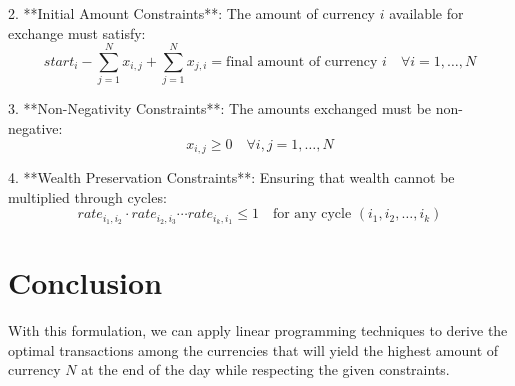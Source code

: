 \documentclass{article}
\begin{document}
2. **Initial Amount Constraints**: The amount of currency \(i\) available for exchange must satisfy:
   \[
   start_i - \sum_{j=1}^{N} x_{i,j} + \sum_{j=1}^{N} x_{j,i} = \text{final amount of currency } i \quad \forall i = 1, \ldots, N
   \]

3. **Non-Negativity Constraints**: The amounts exchanged must be non-negative:
   \[
   x_{i,j} \geq 0 \quad \forall i,j = 1, \ldots, N
   \]

4. **Wealth Preservation Constraints**: Ensuring that wealth cannot be multiplied through cycles:
   \[
   rate_{i_1,i_2} \cdot rate_{i_2,i_3} \cdots rate_{i_k,i_1} \leq 1 \quad \text{for any cycle } (i_1, i_2, \ldots, i_k)
   \]

\section*{Conclusion}
With this formulation, we can apply linear programming techniques to derive the optimal transactions among the currencies that will yield the highest amount of currency \(N\) at the end of the day while respecting the given constraints.
\end{document}

